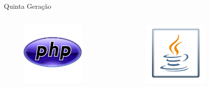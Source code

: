 \documentclass[aspectratio=169,
				xcolor=table]{beamer}
\begin{document}
\begin{frame}{Quinta Geração}
\begin{columns}
\begin{column}{0.23\textwidth}
\begin{figure}
					\includegraphics[width=0.8\textwidth, keepaspectratio]{../figs/cap03/linguagemphp} 			
				\end{figure}
			\end{column}
			\begin{column}{0.23\textwidth}
				\begin{figure}
					\centering
					\includegraphics[width=0.8\textwidth, keepaspectratio]{../figs/cap03/linguagemjava} 			
				\end{figure}
			\end{column}
			\begin{column}{0.23\textwidth}

\end{column}
\end{columns}
\end{frame}
\end{document}
